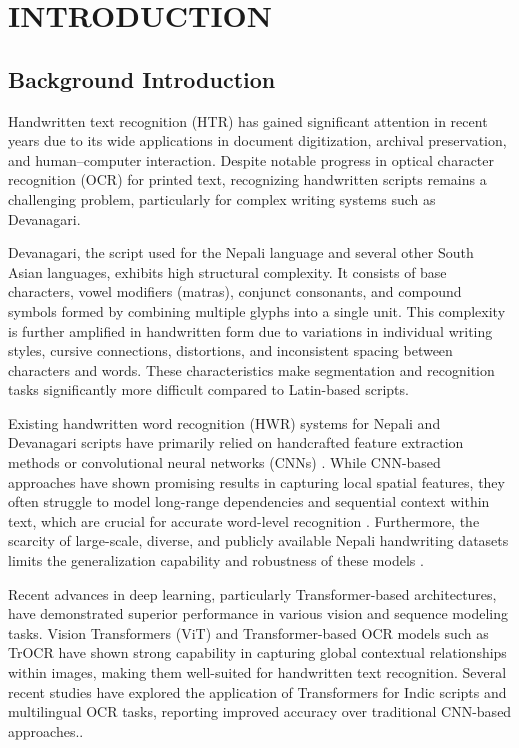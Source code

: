 \chapter{INTRODUCTION}
        \section{Background Introduction}


Handwritten text recognition (HTR) has gained significant attention in recent years due to its wide applications in document digitization, archival preservation, and human--computer interaction. Despite notable progress in optical character recognition (OCR) for printed text, recognizing handwritten scripts remains a challenging problem, particularly for complex writing systems such as Devanagari.

\noindent Devanagari, the script used for the Nepali language and several other South Asian languages, exhibits high structural complexity. It consists of base characters, vowel modifiers (matras), conjunct consonants, and compound symbols formed by combining multiple glyphs into a single unit. This complexity is further amplified in handwritten form due to variations in individual writing styles, cursive connections, distortions, and inconsistent spacing between characters and words. These characteristics make segmentation and recognition tasks significantly more difficult compared to Latin-based scripts.

\noindent Existing handwritten word recognition (HWR) systems for Nepali and Devanagari scripts have primarily relied on handcrafted feature extraction methods or convolutional neural networks (CNNs) \cite{baral2019handwritten, ghimire2020nepali, acharya2022nepali}. While CNN-based approaches have shown promising results in capturing local spatial features, they often struggle to model long-range dependencies and sequential context within text, which are crucial for accurate word-level recognition \cite{michael2019evaluating}. Furthermore, the scarcity of large-scale, diverse, and publicly available Nepali handwriting datasets limits the generalization capability and robustness of these models \cite{10.1007/978-3-030-86337-1_30}.

\noindent Recent advances in deep learning, particularly Transformer-based architectures, have demonstrated superior performance in various vision and sequence modeling tasks. Vision Transformers (ViT) \cite{dosovitskiy2020image} and Transformer-based OCR models such as TrOCR \cite{li2023trocr} have shown strong capability in capturing global contextual relationships within images, making them well-suited for handwritten text recognition. Several recent studies have explored the application of Transformers for Indic scripts and multilingual OCR tasks, reporting improved accuracy over traditional CNN-based approaches.\cite{hasan2023optical, li2025htr,10.1007/978-3-031-93688-3_17}.

